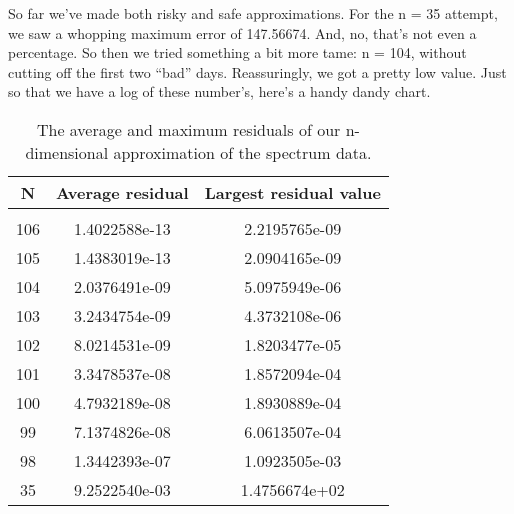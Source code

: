 \documentclass{article}
\begin{document}
So far we've made both risky and safe approximations.  For the n = 35
attempt, we saw a whopping maximum error of 147.56674.  And, no, that's not
even a percentage.  So then we tried something a bit more tame: n =
104, without cutting off the first two ``bad'' days.  Reassuringly, we
got a pretty low value.  Just so that we have a log of these number's,
here's a handy dandy chart.
\begin{table}[r]
  \centering
  \begin{tabular}[c]{c||cc}
    \hline\hline
    N & Average residual & Largest residual value \\
    \hline \\
    106 & 1.4022588e-13 & 2.2195765e-09 \\
    105 & 1.4383019e-13 & 2.0904165e-09 \\
    104 & 2.0376491e-09 & 5.0975949e-06 \\
    103 & 3.2434754e-09 & 4.3732108e-06 \\
    102 & 8.0214531e-09 & 1.8203477e-05 \\
    101 & 3.3478537e-08 & 1.8572094e-04 \\
    100 & 4.7932189e-08 & 1.8930889e-04 \\
    99 & 7.1374826e-08 & 6.0613507e-04 \\
    98 & 1.3442393e-07 & 1.0923505e-03 \\
    35 & 9.2522540e-03 & 1.4756674e+02 \\
    \hline\hline
  \end{tabular}
  \caption{The average and maximum residuals of our n-dimensional
    approximation of the spectrum data.}
\label{tab:residuals}
\end{table}
\end{document}
